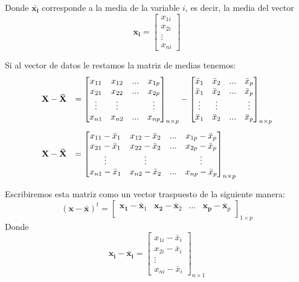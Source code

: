 \documentclass[12pt,letterpaper]{report} %
\begin{document}
Donde $\bar{\mathbf{x_i}}$ corresponde a la media de la variable $i$, es decir, la media del vector 
$$
\mathbf{x_i}=\begin{bmatrix}
x_{1i}\\
x_{2i}\\
\vdots\\
x_{ni}
\end{bmatrix}
$$

Si al vector de datos le restamos la matriz de medias tenemos:
$$
\begin{array}{rl}\vspace{3 mm}
\mathbf{X-\bar{X}} & = \begin{bmatrix}
x_{11} & x_{12} & ... & x_{1p} \\
x_{21} & x_{22} & ... & x_{2p} \\
\vdots & \vdots &   & \vdots \\
x_{n1} & x_{n2} & ... & x_{np}
\end{bmatrix}_{n\times p}
-
\begin{bmatrix}
\bar{x}_{1} & \bar{x}_{2} & ... & \bar{x}_{p} \\
\bar{x}_{1} & \bar{x}_{2} & ... & \bar{x}_{p} \\
\vdots & \vdots &   & \vdots \\
\bar{x}_{1} & \bar{x}_{2} & ... & \bar{x}_{p} 
\end{bmatrix}_{n\times p} \\
\mathbf{X-\bar{X}} & = \begin{bmatrix}
x_{11}-\bar{x}_{1} & x_{12}-\bar{x}_{2} & ... & x_{1p}-\bar{x}_{p} \\ 
x_{21}-\bar{x}_{1} & x_{22}-\bar{x}_{2} & ... & x_{2p}-\bar{x}_{p} \\
\vdots & \vdots &   & \vdots \\
x_{n1}-\bar{x}_{1} & x_{n2}-\bar{x}_{2} & ... & x_{np}-\bar{x}_{p}
\end{bmatrix}_{n\times p}
\end{array}
$$

Escribiremos esta matriz como un vector traspuesto de la siguiente manera:
$$
(\mathbf{x-\bar{x}})^t = \begin{bmatrix}
\mathbf{x_{1}}-\bar{\mathbf{x}}_{1} & \mathbf{x_{2}}-\bar{\mathbf{x}}_{2} & ... & \mathbf{x_{p}}-\bar{\mathbf{x}}_{p} \\
\end{bmatrix}_{1\times p}
$$
Donde 
$$
\mathbf{x_{i}}-\mathbf{\bar{x}_{i}} = \begin{bmatrix}
x_{1i}-\bar{x}_{i}\\
x_{2i}-\bar{x}_{i}\\
\vdots\\
x_{ni}-\bar{x}_{i}
\end{bmatrix}_{n\times 1}
$$
\end{document}

